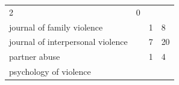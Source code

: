 \documentclass[]{tufte-handout}
\begin{document}
\begin{longtable}[]{@{}llll@{}}
\begin{minipage}[t]{0.06\columnwidth}
2\strut
\end{minipage} & \begin{minipage}[t]{0.06\columnwidth}\raggedright\strut
0\strut
\end{minipage}\tabularnewline
\begin{minipage}[t]{0.63\columnwidth}\raggedright\strut
journal of family violence\strut
\end{minipage} & \begin{minipage}[t]{0.04\columnwidth}\raggedright\strut
\strut
\end{minipage} & \begin{minipage}[t]{0.06\columnwidth}\raggedright\strut
1\strut
\end{minipage} & \begin{minipage}[t]{0.06\columnwidth}\raggedright\strut
8\strut
\end{minipage}\tabularnewline
\begin{minipage}[t]{0.63\columnwidth}\raggedright\strut
journal of interpersonal violence\strut
\end{minipage} & \begin{minipage}[t]{0.04\columnwidth}\raggedright\strut
\strut
\end{minipage} & \begin{minipage}[t]{0.06\columnwidth}\raggedright\strut
7\strut
\end{minipage} & \begin{minipage}[t]{0.06\columnwidth}\raggedright\strut
20\strut
\end{minipage}\tabularnewline
\begin{minipage}[t]{0.63\columnwidth}\raggedright\strut
partner abuse\strut
\end{minipage} & \begin{minipage}[t]{0.04\columnwidth}\raggedright\strut
\strut
\end{minipage} & \begin{minipage}[t]{0.06\columnwidth}\raggedright\strut
1\strut
\end{minipage} & \begin{minipage}[t]{0.06\columnwidth}\raggedright\strut
4\strut
\end{minipage}\tabularnewline
\begin{minipage}[t]{0.63\columnwidth}\raggedright\strut
psychology of violence\strut
\end{minipage} & \begin{minipage}[t]{0.04\columnwidth}\raggedright\strut
\strut
\end{minipage} & \begin{minipage}[t]{0.06\columnwidth}\raggedright\strut

\end{minipage}
\end{longtable}
\end{document}
